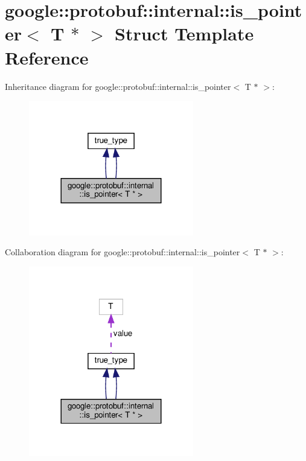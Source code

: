 \hypertarget{structgoogle_1_1protobuf_1_1internal_1_1is__pointer_3_01T_01_5_01_4}{}\section{google\+:\+:protobuf\+:\+:internal\+:\+:is\+\_\+pointer$<$ T $\ast$ $>$ Struct Template Reference}
\label{structgoogle_1_1protobuf_1_1internal_1_1is__pointer_3_01T_01_5_01_4}


Inheritance diagram for google\+:\+:protobuf\+:\+:internal\+:\+:is\+\_\+pointer$<$ T $\ast$ $>$\+:
\nopagebreak
\begin{figure}[H]
\begin{center}
\leavevmode
\includegraphics[width=204pt]{structgoogle_1_1protobuf_1_1internal_1_1is__pointer_3_01T_01_5_01_4__inherit__graph}
\end{center}
\end{figure}


Collaboration diagram for google\+:\+:protobuf\+:\+:internal\+:\+:is\+\_\+pointer$<$ T $\ast$ $>$\+:
\nopagebreak
\begin{figure}[H]
\begin{center}
\leavevmode
\includegraphics[width=204pt]{structgoogle_1_1protobuf_1_1internal_1_1is__pointer_3_01T_01_5_01_4__coll__graph}
\end{center}
\end{figure}
